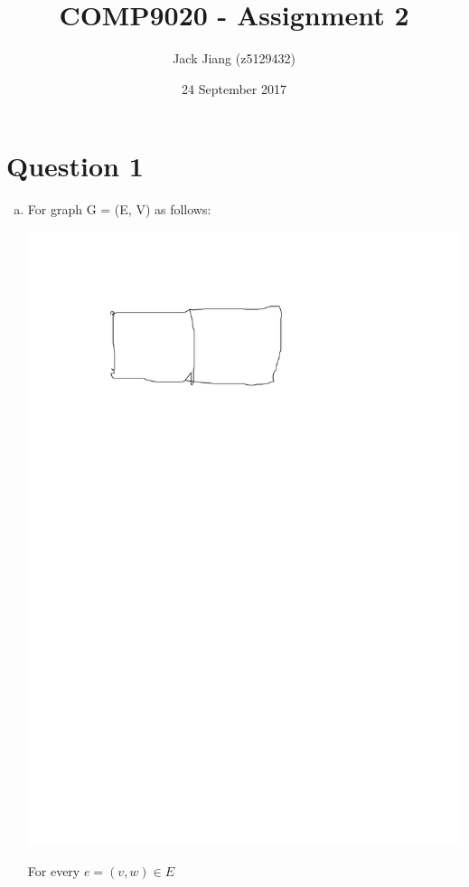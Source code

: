 \documentclass[11pt, a4paper]{article}
\begin{document}
\title{COMP9020 - Assignment 2}
\author{Jack Jiang (z5129432)}
\date{ 24 September 2017 }
\maketitle
\graphicspath{{Graphics/}}

\section*{Question 1}
\begin{enumerate}[(a)]
    \item
    For graph G = (E, V) as follows:\\
    \begin{center}
        \includegraphics{q1a1}
    \end{center}
    For every $e = (v, w) \in E$\\

\end{enumerate}
\end{document}
